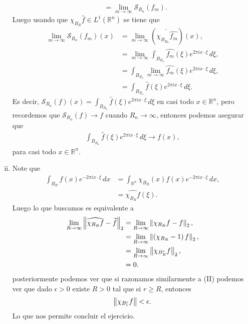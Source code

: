 \begin{homeworkProblem}
\begin{solution}
\begin{enumerate}[(i)]
\begin{align*}
        &=\lim_{m \to \infty}\mathcal{S}_{R_n}(f_m).
      \end{align*}
      Luego usando que $\chi_{B_{R}}\hat{f}\in L^1(\mathbb{R}^{n})$ se tiene que
      \begin{align*}
        \lim_{m \to \infty}\mathcal{S}_{R_{n}}(f_m)(x)&=\lim_{m \to \infty}\left( \check{\chi_{B_{R_{n}}}\hat{f_{m}}} \right)(x),\\
        &=\lim_{m \to \infty}\int_{B_{R_{n}}}\hat{f_m}(\xi)e^{2\pi ix\cdot\xi}\, d\xi,\\
        &=\int_{B_{R_{n}}}\lim_{m \to \infty}\hat{f_m}(\xi)e^{2\pi ix\cdot\xi}\, d\xi,\\
        &=\int_{B_{R_{n}}}\hat{f}(\xi)e^{2\pi ix\cdot\xi}\, d\xi.
      \end{align*}
      Es decir, $\mathcal{S}_{R_n}(f)(x)=\int_{B_{R_{n}}}\hat{f}(\xi)e^{2\pi ix\cdot\xi}\, d\xi$ en casi todo $x\in\mathbb{R}^{n}$, pero recordemos que $\mathcal{S}_{R_n}(f)\to f$ cuando $R_{n}\to\infty$, entonces podemos asegurar que
      \begin{align*}
        \int_{B_{R_n}}\hat{f}(\xi)e^{2\pi ix\cdot\xi}\, d\xi \to f(x),
      \end{align*}
      para casi todo $x\in \mathbb{R}^{n}$.
      \item Note que
        \begin{align*}
          \int_{B_{R}}f(x)e^{-2\pi ix\cdot \xi}\, dx&=\int_{\mathbb{R}^{n}}\chi_{B_{R}}(x)f(x)e^{-2\pi ix\cdot\xi}\, dx,\\
          &=\hat{\chi_{B_{R}}f}(\xi).
        \end{align*}
        Luego lo que buscamos es equivalente a
        \begin{align*}
          \lim_{R \to \infty}\left\|\widehat{\chi_{B_{R}}f}-\widehat{f}\right\|_{2}&=\lim_{R \to \infty}\left\|\chi_{B_{R}}f-f\right\|_2,\\
          &=\lim_{R \to \infty}\left\|\left( \chi_{B_{R}}-1 \right)f\right\|_{2},\\
          &=\lim_{R \to \infty}\left\|\chi_{B_{R}^{c}}f\right\|_{2},\\
          &=0.
        \end{align*}
        posteriormente podemos ver que si razonamos similarmente a (II) podemos ver que dado $\epsilon>0$ existe $R>0$ tal que si $r\geq R$, entonces
        \begin{align*}
          \left\|\chi_{B_{r}^{c}}f\right\|<\epsilon.
        \end{align*}
        Lo que nos permite concluir el ejercicio.
    \end{enumerate}    
  \end{solution}
\end{homeworkProblem}
